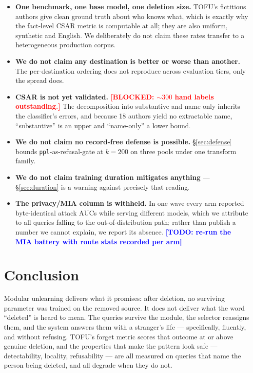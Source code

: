\documentclass[11pt]{article}
\newcommand{\blocked}[1]{\textcolor{red}{\textbf{[BLOCKED: #1]}}}
\newcommand{\todonote}[1]{\textcolor{blue}{\textbf{[TODO: #1]}}}
\newcommand{\csar}{CSAR}
\begin{document}
\begin{itemize}
  \item \textbf{One benchmark, one base model, one deletion size.} TOFU's fictitious authors give
        clean ground truth about who knows what, which is exactly why the fact-level \csar{} metric
        is computable at all; they are also uniform, synthetic and English. We deliberately do not
        claim these rates transfer to a heterogeneous production corpus.
  \item \textbf{We do not claim any destination is better or worse than another.} The per-destination
        ordering does not reproduce across evaluation tiers, only the spread does.
  \item \textbf{\csar{} is not yet validated.} \blocked{${\sim}300$ hand labels outstanding.} The
        decomposition into substantive and name-only inherits the classifier's errors, and because
        18 authors yield no extractable name, ``substantive'' is an upper and ``name-only'' a lower
        bound.
  \item \textbf{We do not claim no record-free defense is possible.} \S\ref{sec:defense} bounds
        \texttt{ppl}-as-refusal-gate at $k=200$ on three pools under one transform family.
  \item \textbf{We do not claim training duration mitigates anything} --- \S\ref{sec:duration} is a
        warning against precisely that reading.
  \item \textbf{The privacy/MIA column is withheld.} In one wave every arm reported byte-identical
        attack AUCs while serving different models, which we attribute to all queries falling to the
        out-of-distribution path; rather than publish a number we cannot explain, we report its
        absence. \todonote{re-run the MIA battery with route stats recorded per arm}
\end{itemize}

\section{Conclusion}

Modular unlearning delivers what it promises: after deletion, no surviving parameter was trained on
the removed source. It does not deliver what the word ``deleted'' is heard to mean. The queries
survive the module, the selector reassigns them, and the system answers them with a stranger's life
--- specifically, fluently, and without refusing. TOFU's forget metric scores that outcome at or
above genuine deletion, and the properties that make the pattern look safe --- detectability,
locality, refusability --- are all measured on queries that name the person being deleted, and all
degrade when they do not.
\end{document}
